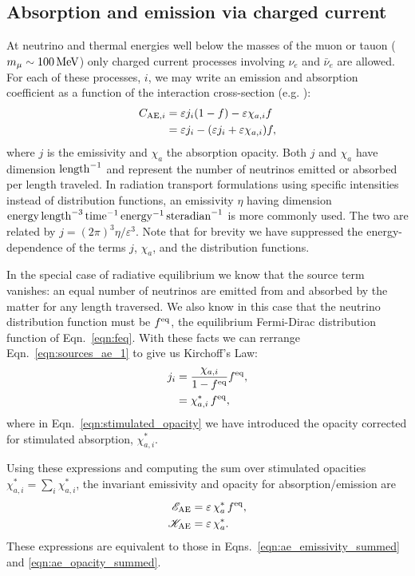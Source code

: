 \documentclass[aps,floatfix,prd,superscriptaddress,twocolumn]{revtex4-1}
\begin{document}
\subsection{Absorption and emission via charged current}
\label{ssec:sources_ae}
At neutrino and thermal energies well below the masses of the muon or tauon
($m_{\mu}\sim100\,{\rm MeV}$)
only charged current processes involving $\nu_e$ and $\bar{\nu}_e$ are allowed.
For each of these processes, $i$, we may write an emission and absorption
coefficient as a function of the interaction cross-section
(e.g. \cite[Eqn.~A5]{brue1985-core_collapse}):
\begin{align}
  \label{eqn:sources_ae_1}
  C_{{\rm AE},i}
  &= \varepsilon j_i (1-f) - \varepsilon \chi_{a,i} f \\
  \label{eqn:sources_ae_2}
  &= \varepsilon j_i - (\varepsilon j_i+\varepsilon \chi_{a,i}) f,
\end{align}
where $j$ is the emissivity and $\chi_a$ the absorption opacity.
Both $j$ and $\chi_a$ have dimension ${\rm length}^{-1}$ and represent the
number of neutrinos emitted or absorbed per length traveled.
In radiation transport formulations using specific intensities instead of
distribution functions, an emissivity $\eta$ having dimension
${\rm energy}\,{\rm length}^{-3}\,{\rm time}^{-1}\,{\rm energy}^{-1}\,{\rm steradian}^{-1}$
is more commonly used.
The two are related by $j=(2\pi)^3\eta/\varepsilon^3$.
Note that for brevity we have suppressed the energy-dependence of
the terms $j$, $\chi_a$, and the distribution functions.

In the special case of radiative equilibrium we know that the source
term vanishes: an equal number of neutrinos are emitted from
and absorbed by the matter for any length traversed.
We also know in this case that the neutrino distribution function must be
$f^{\rm eq}$, the equilibrium Fermi-Dirac distribution function of
Eqn.~\ref{eqn:feq}.
With these facts we can rerrange Eqn.~\ref{eqn:sources_ae_1} to give us
Kirchoff's Law:
\begin{align}
  \label{eqn:kirchoffs_law}
  j_i &= \frac{\chi_{a,i}}{1-f^{\rm eq}}f^{\rm eq}, \\
  \label{eqn:stimulated_opacity}
  &= \chi^*_{a,i}\,f^{\rm eq},
\end{align}
where in Eqn.~\ref{eqn:stimulated_opacity} we have introduced the opacity
corrected for stimulated absorption, $\chi^*_{a,i}$.

Using these expressions and computing the sum over stimulated opacities
$\chi^*_{a,i}=\sum_i \chi^*_{a,i}$,
the invariant emissivity and opacity for absorption/emission are
\begin{align}
  \label{eqn:ae_emissivity_summed_2}
  \mathscr{E}_{{\rm AE}} &= \varepsilon \, \chi^*_a \, f^{\rm eq}, \\
  \label{eqn:ae_opacity_summed_2}
  \mathscr{K}_{{\rm AE}} &= \varepsilon \, \chi^*_a.
\end{align}
These expressions are equivalent to those in
Eqns.~\ref{eqn:ae_emissivity_summed} and \ref{eqn:ae_opacity_summed}.
\end{document}
